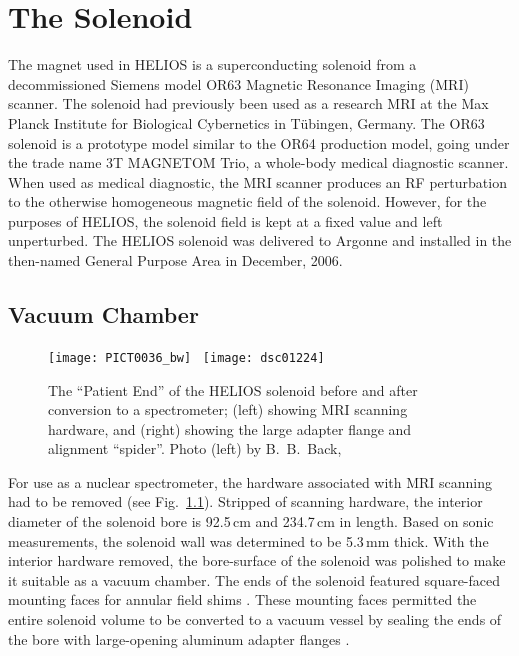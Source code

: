 \chapter{The Solenoid}
\label{sol}
The magnet used in HELIOS is a superconducting solenoid from a decommissioned Siemens model OR63  Magnetic Resonance Imaging (MRI) scanner.  The solenoid had previously been used as a research MRI at the Max Planck Institute for Biological Cybernetics in T\"ubingen, Germany.  The OR63 solenoid is a prototype model similar to the OR64 production  model, going under the trade name 3T MAGNETOM Trio, a whole-body medical diagnostic scanner.  When used as medical diagnostic, the MRI scanner produces an RF perturbation to the otherwise homogeneous magnetic field of the solenoid.  However, for the purposes of HELIOS, the solenoid field is kept at a fixed value and left unperturbed. %
The HELIOS solenoid was delivered to Argonne and installed in the then-named General Purpose Area in December, 2006.

\section{Vacuum Chamber}

\begin{figure}%
\centering
\texttt{[image: PICT0036\_bw]}~
\texttt{[image: dsc01224]}%
\caption[The ``Patient End'' of the HELIOS solenoid before and after conversion to a spectrometer]{The ``Patient End'' of the HELIOS solenoid before and after conversion to a spectrometer; (left) showing MRI scanning hardware, and (right) showing the large adapter flange and alignment ``spider''. Photo (left) by B.~B.\ Back, \photodate{} }%
\label{MRI}%
\end{figure}

For use as a nuclear spectrometer, the hardware associated with MRI scanning had to be removed (see Fig.~\ref{MRI}).  Stripped of scanning hardware, the interior diameter of the solenoid bore is 92.5\,cm and 234.7\,cm in length.  Based on sonic measurements, the solenoid wall was determined to be 5.3\,mm thick.  With the interior hardware removed, the bore-surface of the solenoid was polished to make it suitable as a vacuum chamber.  The ends of the solenoid featured square-faced mounting faces for annular field shims%
.  These mounting faces permitted the entire solenoid volume to be converted to a vacuum vessel by sealing the ends of the bore with large-opening aluminum adapter flanges%
.

